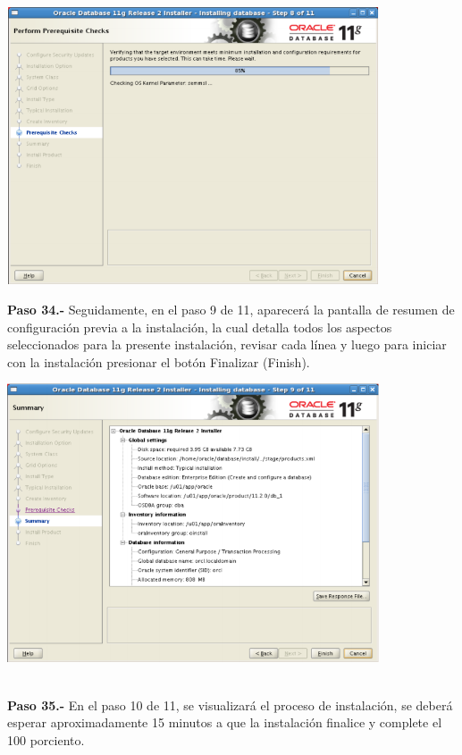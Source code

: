 \begin{enumerate}
\begin{center}
  \includegraphics[width=11cm]{Imagenes/Oracle_Database/Paso_33.png}
\end{center}
\break

\textbf {Paso 34.-} Seguidamente, en el paso 9 de 11, aparecerá la pantalla de resumen de configuración previa a la instalación, la cual detalla todos los aspectos seleccionados para la presente instalación, revisar cada línea y luego para iniciar con la instalación presionar el botón Finalizar (Finish).

\begin{center}
  \includegraphics[width=11cm]{Imagenes/Oracle_Database/Paso_34.png}
\end{center}
\vspace{12pt}\\

\textbf {Paso 35.-} En el paso 10 de 11, se visualizará el proceso de instalación, se deberá esperar aproximadamente 15 minutos a que la instalación finalice y complete el 100 porciento.


\end{enumerate}
